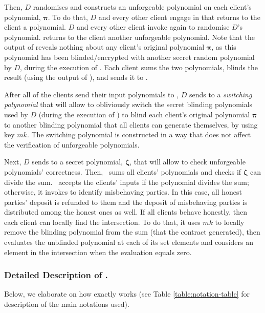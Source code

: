 Then, $D$ randomises and constructs an unforgeable polynomial on each client's polynomial, $\bm\pi$. To do that, $D$ and every other client engage in \vopr that returns to the client a polynomial. $D$ and every other client invoke \vopr again to randomise $D$'s polynomial. \vopr returns to the client another unforgeable polynomial. Note that the output of \vopr reveals nothing about any client's original polynomial $\bm\pi$, as this polynomial has been blinded/encrypted with another secret random polynomial by $D$, during the execution of \vopr. Each client sums the two polynomials,  blinds the result (using the output of  \zspaa), and sends it to \scf. 



After all of the clients send their input polynomials to \scf, $D$ sends to \scf a \emph{switching polynomial} that will allow \scf to obliviously switch the secret blinding polynomials used by $D$ (during the execution of \vopr) to blind each client's original polynomial $\bm\pi$  to another blinding polynomial that all clients can generate themselves, by using key $mk$.  The switching polynomial is constructed in a way that does not affect the verification of unforgeable polynomials. 




Next, $D$ sends to \scf a secret polynomial, $\bm\zeta$, that will allow \scf to check unforgeable polynomials' correctness. Then, \scf\ sums all clients' polynomials and checks if $\bm\zeta$ can divide the sum. \scf\ accepts the clients' inputs if the polynomial divides the sum; otherwise, it invokes \aud to identify misbehaving parties.  In this case, all honest parties' deposit is refunded to them and the deposit of misbehaving parties is distributed among the honest ones as well. If all clients behave honestly,  then each client can locally find the intersection. To do that, it uses $mk$ to locally remove the blinding polynomial from the sum (that the contract generated), then evaluates the unblinded polynomial at each of its set elements and considers an element in the intersection when the evaluation equals zero. 


\subsubsection{Detailed Description of \fpsi.} Below, we elaborate on how \fpsi exactly works (see Table \ref{table:notation-table} for description of the main notations used). 

